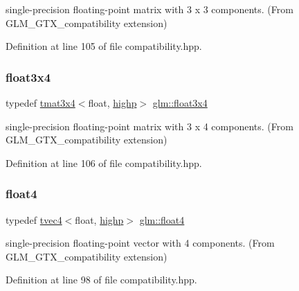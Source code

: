 single-\/precision floating-\/point matrix with 3 x 3 components. (From G\+L\+M\+\_\+\+G\+T\+X\+\_\+compatibility extension) 



Definition at line 105 of file compatibility.\+hpp.

\mbox{\label{group__gtx__compatibility_gadbca4a528b4ef17b78afe91c00420087}} 
\subsubsection{\texorpdfstring{float3x4}{float3x4}}
{\footnotesize\ttfamily typedef \mbox{\hyperlink{structglm_1_1tmat3x4}{tmat3x4}}$<$float, \mbox{\hyperlink{namespaceglm_a0f04f086094c747d227af4425893f545ac6f7eab42eacbb10d59a58e95e362074}{highp}}$>$ \mbox{\hyperlink{group__gtx__compatibility_gadbca4a528b4ef17b78afe91c00420087}{glm\+::float3x4}}}



single-\/precision floating-\/point matrix with 3 x 4 components. (From G\+L\+M\+\_\+\+G\+T\+X\+\_\+compatibility extension) 



Definition at line 106 of file compatibility.\+hpp.

\mbox{\label{group__gtx__compatibility_ga05e1940d91deb4bbe819881bf65dc52d}} 
\subsubsection{\texorpdfstring{float4}{float4}}
{\footnotesize\ttfamily typedef \mbox{\hyperlink{structglm_1_1tvec4}{tvec4}}$<$float, \mbox{\hyperlink{namespaceglm_a0f04f086094c747d227af4425893f545ac6f7eab42eacbb10d59a58e95e362074}{highp}}$>$ \mbox{\hyperlink{group__gtx__compatibility_ga05e1940d91deb4bbe819881bf65dc52d}{glm\+::float4}}}



single-\/precision floating-\/point vector with 4 components. (From G\+L\+M\+\_\+\+G\+T\+X\+\_\+compatibility extension) 



Definition at line 98 of file compatibility.\+hpp.

